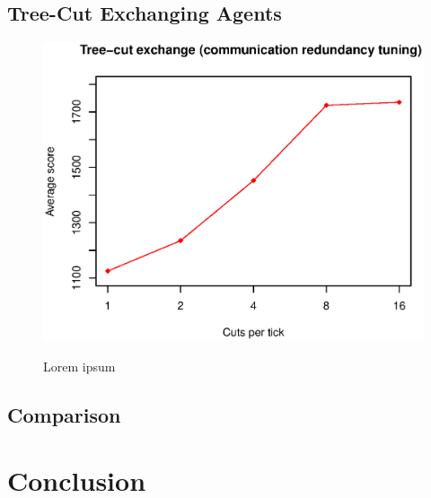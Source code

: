 \subsection{Tree-Cut Exchanging Agents}

\begin{figure}
\begin{center}
\includegraphics{img/tree-cut-tuning.eps}
\end{center}
\caption{\footnotesize Lorem ipsum}{\footnotesize }
\label{fig_tree_cut_tuning}
\end{figure}

\subsection{Comparison}

\section{Conclusion}
